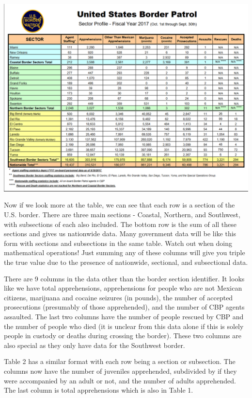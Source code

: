 \documentclass[
]{krantz}
\begin{document}
\includegraphics{images/pdf_table_1.PNG}

Now if we look more at the table, we can see that each row is a section of the U.S. border. There are three main sections - Coastal, Northern, and Southwest, with subsections of each also included. The bottom row is the sum of all these sections and gives us nationwide data. Many government data will be like this form with sections and subsections in the same table. Watch out when doing mathematical operations! Just summing any of these columns will give you triple the true value due to the presence of nationwide, sectional, and subsectional data.

There are 9 columns in the data other than the border section identifier. It looks like we have total apprehensions, apprehensions for people who are not Mexican citizens, marijuana and cocaine seizures (in pounds), the number of accepted prosecutions (presumably of those apprehended), and the number of CBP agents assaulted. The last two columns have the number of people rescued by CBP and the number of people who died (it is unclear from this data alone if this is solely people in custody or deaths during crossing the border). These two columns are also special as they only have data for the Southwest border.

Table 2 has a similar format with each row being a section or subsection. The columns now have the number of juveniles apprehended, subdivided by if they were accompanied by an adult or not, and the number of adults apprehended. The last column is total apprehensions which is also in Table 1.
\end{document}
